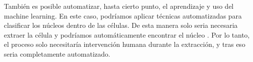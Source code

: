 \documentclass[12pt, letterpaper]{article}
\begin{document}
También es posible automatizar, hasta cierto punto, el aprendizaje y uso del machine learning. En este caso, podríamos aplicar técnicas automatizadas para clasificar los núcleos dentro de las células. De esta manera solo seria necesaria extraer la célula y podríamos automáticamente encontrar el núcleo \autocite{sirinukunwattanaLocalitySensitiveDeep2016}. Por lo tanto, el proceso solo necesitaría intervención humana durante la extracción, y tras eso seria completamente automatizado.

\newpage

\printbibliography
\end{document}
